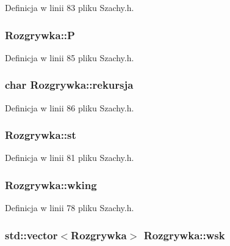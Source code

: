 \-Definicja w linii 83 pliku \-Szachy.\-h.

\hypertarget{class_rozgrywka_aeae1debddab56c1028014402f97eebda}{
\subsubsection[{\-P}]{ {\bf \-Rozgrywka\-::\-P}}}\label{class_rozgrywka_aeae1debddab56c1028014402f97eebda}


\-Definicja w linii 85 pliku \-Szachy.\-h.

\hypertarget{class_rozgrywka_ab8da8c6df7b1a4673e79af7f09e90f5c}{
\subsubsection[{rekursja}]{\setlength{\rightskip}{0pt plus 5cm}char {\bf \-Rozgrywka\-::rekursja}}}\label{class_rozgrywka_ab8da8c6df7b1a4673e79af7f09e90f5c}


\-Definicja w linii 86 pliku \-Szachy.\-h.

\hypertarget{class_rozgrywka_ac8e44798bc9896c1bd56f4b07eee07b4}{
\subsubsection[{st}]{ {\bf \-Rozgrywka\-::st}}}\label{class_rozgrywka_ac8e44798bc9896c1bd56f4b07eee07b4}


\-Definicja w linii 81 pliku \-Szachy.\-h.

\hypertarget{class_rozgrywka_a35556003d852bbed7adfb165a27232f4}{
\subsubsection[{wking}]{ {\bf \-Rozgrywka\-::wking}}}\label{class_rozgrywka_a35556003d852bbed7adfb165a27232f4}


\-Definicja w linii 78 pliku \-Szachy.\-h.

\hypertarget{class_rozgrywka_a5517c4100004d16c73be0f50a90fa193}{
\subsubsection[{wsk}]{\setlength{\rightskip}{0pt plus 5cm}std\-::vector$<${\bf \-Rozgrywka}$>$ {\bf \-Rozgrywka\-::wsk}}}\label{class_rozgrywka_a5517c4100004d16c73be0f50a90fa193}



